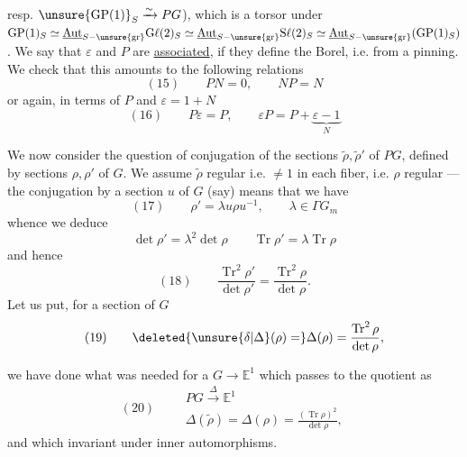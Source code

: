 

resp. $\unsure{\mathrm{GP}(1)}_S\xrightarrow{\sim}PG$),
which is a torsor under
$\mathrm{GP}(1)_S\simeq
\underline{\mathrm{Aut}}_{S-\unsure{\mathrm{gr}}}\mathrm{G}\ell(2)_S
\simeq\underline{\mathrm{Aut}}_{S-\unsure{\mathrm{gr}}}\mathrm{S}\ell(2)_S
\simeq\underline{\mathrm{Aut}}_{S-\unsure{\mathrm{gr}}}
(\mathrm{GP}(1)_S)$.
We say that $\varepsilon$ and $P$ are
\uline{associated},
if they define the  Borel,
i.e. 
 from a pinning.
We check that this amounts to the following relations
\[
(15)\qquad PN=0,\qquad NP=N
\]
 or again, in terms of $P$ and $\varepsilon=1+N$
\[
(16)\qquad P\varepsilon=P,\qquad
\varepsilon P=P+\underbrace{\varepsilon-1}_{N}
\]

We now consider the question of
 conjugation of the sections
$\widetilde\rho,\widetilde\rho'$ of $PG$,
defined by sections $\rho,\rho'$ of $G$.
We assume $\widetilde\rho$ regular i.e. $\ne1$ in
each  fiber, i.e. $\rho$ regular —
 the conjugation
by a section $u$ of $G$ (say) means that we have
\[
(17)\qquad \rho'=\lambda u\rho u^{-1},\qquad
\lambda\in\Gamma G_m
\]
whence we deduce
\[
\det\rho'=\lambda^2\det\rho\qquad
\operatorname{Tr}\rho'=\lambda\operatorname{Tr}\rho
\]
and hence
\[
(18)\qquad
\frac{\operatorname{Tr}^2\rho'}{\det\rho'}
=\frac{\operatorname{Tr}^2\rho}{\det\rho}.
\]
Let us put, for a section of $G$
\[
(19)\qquad
\deleted{\unsure{\delta|\Delta}(\rho)=}
\Delta(\rho)=\frac{\operatorname{Tr}^2\rho}{\det\rho},
\]



we have done what was needed for 
 a $G\longrightarrow \mathbb E^1$ which passes to the
quotient as
\[
(20)\qquad
\begin{gathered}
PG\xrightarrow{\Delta}\mathbb E^1\\
\Delta(\widetilde\rho)=\Delta(\rho)
=\frac{(\operatorname{Tr}\rho)^2}{\det\rho},
\end{gathered}
\]
and which  invariant under inner automorphisms.

